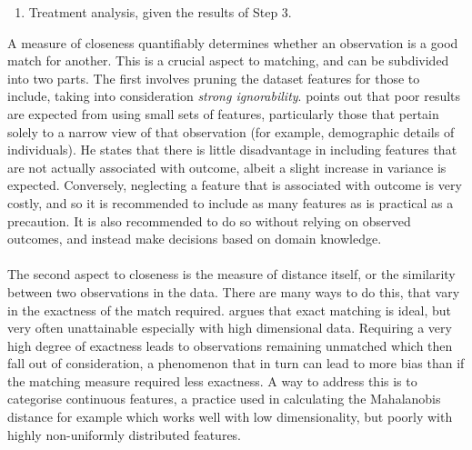 {\begin {enumerate}
\item{Treatment analysis, given the results of Step 3.}
\end{enumerate}
A measure of closeness quantifiably determines whether an observation is a good match for another. This is a crucial aspect to matching, and can be subdivided into two parts. The first involves pruning the dataset features for those to include, taking into consideration {\it strong ignorability}. \cite{stuart2010matching} points out that poor results are expected from using small sets of features, particularly those that pertain solely to a narrow view of that observation (for example, demographic details of individuals). He states that there is little disadvantage in including features that are not actually associated with outcome, albeit a slight increase in variance is expected. Conversely, neglecting a feature that is associated with outcome is very costly, and so it is recommended to include as many features as is practical as a precaution. It is also recommended to do so without relying on observed outcomes, and instead make decisions based on domain knowledge. \\\\
The second aspect to closeness is the measure of distance itself, or the similarity between two observations in the data. There are many ways to do this, that vary in the exactness of the match required. \cite{stuart2010matching} argues that exact matching is ideal, but very often unattainable especially with high dimensional data. Requiring a very high degree of exactness leads to observations remaining unmatched which then fall out of consideration, a phenomenon that in turn can lead to more bias than if the matching measure required less exactness. A way to address this is to categorise continuous features, a practice used in calculating the Mahalanobis distance for example which works well with low dimensionality, but poorly with highly non-uniformly distributed features.
\\\\ 
}
